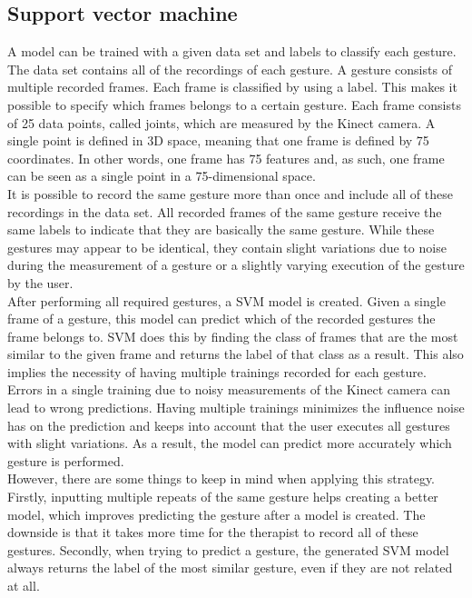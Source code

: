 \subsection{Support vector machine}

A model can be trained with a given data set and labels to classify each gesture. The data set contains all of the recordings of each gesture. A gesture consists of multiple recorded frames. Each frame is classified by using a label. This makes it possible to specify which frames belongs to a certain gesture. Each frame consists of 25 data points, called joints, which are measured by the Kinect camera. A single point is defined in 3D space, meaning that one frame is defined by 75 coordinates. In other words, one frame has 75 features and, as such, one frame can be seen as a single point in a 75-dimensional space.\\

It is possible to record the same gesture more than once and include all of these recordings in the data set. All recorded frames of the same gesture receive the same labels to indicate that they are basically the same gesture. While these gestures may appear to be identical, they contain slight variations due to noise during the measurement of a gesture or a slightly varying execution of the gesture by the user.\\

After performing all required gestures, a SVM model is created. Given a single frame of a gesture, this model can predict which of the recorded gestures the frame belongs to. SVM does this by finding the class of frames that are the most similar to the given frame and returns the label of that class as a result. This also implies the necessity of having multiple trainings recorded for each gesture. Errors in a single training due to noisy measurements of the Kinect camera can lead to wrong predictions. Having multiple trainings minimizes the influence noise has on the prediction and keeps into account that the user executes all gestures with slight variations. As a result, the model can predict more accurately which gesture is performed.\\

However, there are some things to keep in mind when applying this strategy. Firstly, inputting multiple repeats of the same gesture helps creating a better model, which improves predicting the gesture after a model is created. The downside is that it takes more time for the therapist to record all of these gestures. Secondly, when trying to predict a gesture, the generated SVM model always returns the label of the most similar gesture, even if they are not related at all.\\

